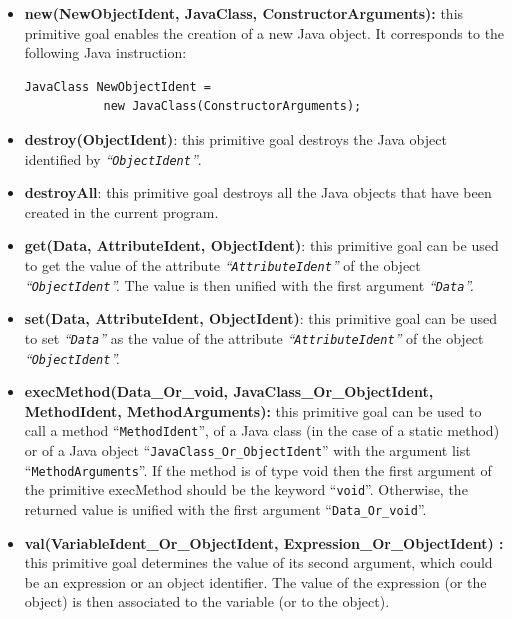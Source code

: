 \documentclass{book}
\begin{document}
\begin{itemize}

\item {\bf new(NewObjectIdent, JavaClass, ConstructorArguments):}
this primitive goal enables the creation of a new Java object. It
corresponds to the following Java instruction:

\begin{verbatim}
JavaClass NewObjectIdent = 
           new JavaClass(ConstructorArguments);
\end{verbatim}


\item {\bf destroy(ObjectIdent)}: this primitive goal destroys the
Java object identified by {\it ``\texttt{ObjectIdent}''}.

\item {\bf destroyAll}: this primitive goal destroys all the Java
objects that have been created in the current program.

\item {\bf get(Data, AttributeIdent, ObjectIdent)}: this primitive
goal can be used to get the value of the attribute {\it
``\texttt{AttributeIdent}''} of the object {\it
``\texttt{ObjectIdent}''.} The value is then unified with the first
argument {\it ``\texttt{Data}''.}

\item {\bf set(Data, AttributeIdent, ObjectIdent)}: this primitive
goal can be used to set {\it ``\texttt{Data}''} as the value of the
attribute {\it ``\texttt{AttributeIdent}''} of the object {\it
``\texttt{ObjectIdent}''.}

\item {\bf execMethod(Data\_Or\_void, JavaClass\_Or\_ObjectIdent,
MethodIdent, MethodArguments):} this primitive goal can be used to
call a method ``\texttt{MethodIdent}'', of a Java class (in the case
of a static method) or of a Java object
``\texttt{JavaClass\_Or\_ObjectIdent}'' with the argument list
``\texttt{MethodArguments}''. If the method is of type void then the
first argument of the primitive execMethod should be the keyword
``\texttt{void}''. Otherwise, the returned value is unified with the
first argument ``\texttt{Data\_Or\_void}''.

\item {\bf val(VariableIdent\_Or\_ObjectIdent, Expression\_Or\_ObjectIdent)
:} this primitive goal determines the value of its second
argument, which could be an expression or an object identifier. The
value of the expression (or the object) is then associated to the
variable (or to the object).

\end{itemize}
\end{document}
